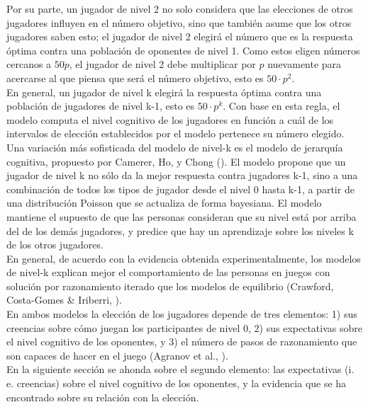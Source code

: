 Por su parte, un jugador de nivel 2 no solo considera que las elecciones de otros jugadores influyen en el número objetivo, sino que también asume que los otros jugadores saben esto; el jugador de nivel 2 elegirá el número que es la respuesta óptima contra una población de oponentes de nivel 1. Como estos eligen números cercanos a $50 \dot p$, el jugador de nivel 2 debe multiplicar por $p$ nuevamente para acercarse al que piensa que será el número objetivo, esto es $50 \cdot p^2$.\\

En general, un jugador de nivel k elegirá la respuesta óptima contra una población de jugadores de nivel k-1, esto es $50 \cdot p^k$.  Con base en esta regla, el modelo computa el nivel cognitivo de los jugadores en función a cuál de los intervalos de elección establecidos por el modelo pertenece su número elegido.\\

Una variación más sofisticada del modelo de nivel-k es el modelo de jerarquía cognitiva, propuesto por Camerer, Ho, y Chong (\citeyear{Camerer}). El modelo propone que un jugador de nivel k no sólo da la mejor respuesta contra jugadores k-1, sino a una combinación de todos los tipos de jugador desde el nivel 0 hasta k-1, a partir de una distribución Poisson que se actualiza de forma bayesiana. El modelo mantiene el supuesto de que las personas consideran que su nivel está por arriba del de los demás jugadores, y predice que hay un aprendizaje sobre los niveles k de los otros jugadores.\\

En general, de acuerdo con la evidencia obtenida experimentalmente, los modelos de nivel-k explican mejor el comportamiento de las personas en juegos con solución por razonamiento iterado que los modelos de equilibrio (Crawford, Costa-Gomes & Iriberri, \citeyear{Crawford}).\\

En ambos modelos la elección de los jugadores depende de tres elementos: 1) sus creencias sobre cómo juegan los participantes de nivel 0, 2) sus expectativas sobre el nivel cognitivo de los oponentes, y 3) el número de pasos de razonamiento que son capaces de hacer en el juego (Agranov et al., \citeyear{Agranov}).\\

En la siguiente sección se ahonda sobre el segundo elemento: las expectativas (i. e. creencias) sobre el nivel cognitivo de los oponentes, y la evidencia que se ha encontrado sobre su relación con la elección.\\

